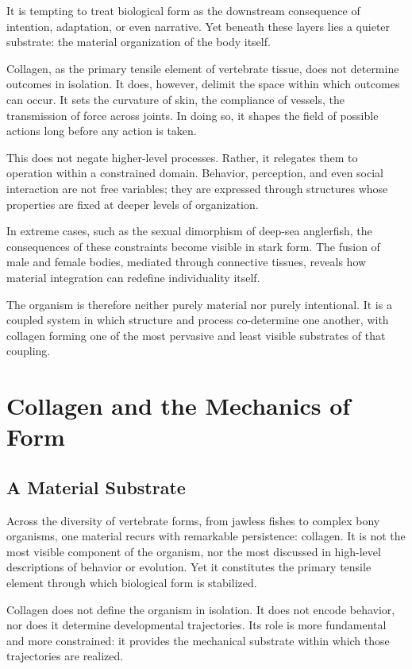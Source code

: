 \documentclass[11pt,oneside]{book}
\begin{document}
It is tempting to treat biological form as the downstream consequence of intention, adaptation, or even narrative. Yet beneath these layers lies a quieter substrate: the material organization of the body itself.

Collagen, as the primary tensile element of vertebrate tissue, does not determine outcomes in isolation. It does, however, delimit the space within which outcomes can occur. It sets the curvature of skin, the compliance of vessels, the transmission of force across joints. In doing so, it shapes the field of possible actions long before any action is taken.

This does not negate higher-level processes. Rather, it relegates them to operation within a constrained domain. Behavior, perception, and even social interaction are not free variables; they are expressed through structures whose properties are fixed at deeper levels of organization.

In extreme cases, such as the sexual dimorphism of deep-sea anglerfish, the consequences of these constraints become visible in stark form. The fusion of male and female bodies, mediated through connective tissues, reveals how material integration can redefine individuality itself.

The organism is therefore neither purely material nor purely intentional. It is a coupled system in which structure and process co-determine one another, with collagen forming one of the most pervasive and least visible substrates of that coupling.

\chapter{Collagen and the Mechanics of Form}

\section{A Material Substrate}

Across the diversity of vertebrate forms, from jawless fishes to complex bony organisms, one material recurs with remarkable persistence: collagen. It is not the most visible component of the organism, nor the most discussed in high-level descriptions of behavior or evolution. Yet it constitutes the primary tensile element through which biological form is stabilized.

Collagen does not define the organism in isolation. It does not encode behavior, nor does it determine developmental trajectories. Its role is more fundamental and more constrained: it provides the mechanical substrate within which those trajectories are realized.
\end{document}
